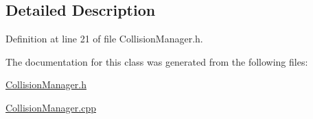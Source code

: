 \subsection{Detailed Description}


Definition at line 21 of file Collision\+Manager.\+h.



The documentation for this class was generated from the following files\+:\begin{DoxyCompactItemize}
\item 
\hyperlink{_collision_manager_8h}{Collision\+Manager.\+h}\item 
\hyperlink{_collision_manager_8cpp}{Collision\+Manager.\+cpp}\end{DoxyCompactItemize}
